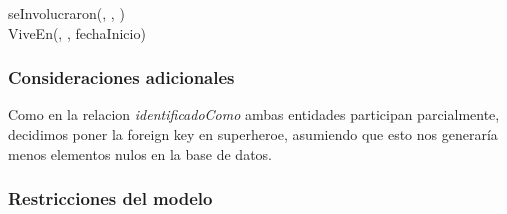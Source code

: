 seInvolucraron(, , )\\

ViveEn(, , fechaInicio)\\

\subsubsection{Consideraciones adicionales}\label{consideraciones-adicionales}

Como en la relacion \emph{identificadoComo} ambas entidades participan
parcialmente, decidimos poner la foreign key en superheroe, asumiendo
que esto nos generaría menos elementos nulos en la base de datos.

\subsubsection{Restricciones del modelo}

